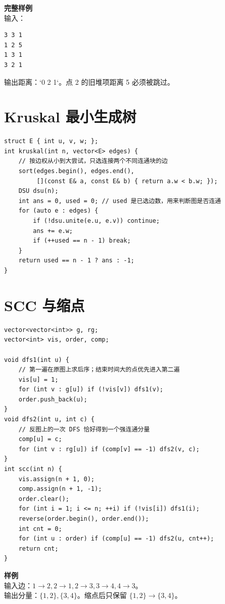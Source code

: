 \begin{card}
\textbf{完整样例}\\
输入：
\begin{lstlisting}
3 3 1
1 2 5
1 3 1
3 2 1
\end{lstlisting}
输出距离：`0 2 1`。点 2 的旧堆项距离 5 必须被跳过。
\end{card}

\section{Kruskal 最小生成树}


\begin{lstlisting}[style=cpp]
struct E { int u, v, w; };
int kruskal(int n, vector<E> edges) {
    // 按边权从小到大尝试，只选连接两个不同连通块的边
    sort(edges.begin(), edges.end(),
         [](const E& a, const E& b) { return a.w < b.w; });
    DSU dsu(n);
    int ans = 0, used = 0; // used 是已选边数，用来判断图是否连通
    for (auto e : edges) {
        if (!dsu.unite(e.u, e.v)) continue;
        ans += e.w;
        if (++used == n - 1) break;
    }
    return used == n - 1 ? ans : -1;
}
\end{lstlisting}

\section{SCC 与缩点}


\begin{lstlisting}[style=cpp]
vector<vector<int>> g, rg;
vector<int> vis, order, comp;

void dfs1(int u) {
    // 第一遍在原图上求后序；结束时间大的点优先进入第二遍
    vis[u] = 1;
    for (int v : g[u]) if (!vis[v]) dfs1(v);
    order.push_back(u);
}
void dfs2(int u, int c) {
    // 反图上的一次 DFS 恰好得到一个强连通分量
    comp[u] = c;
    for (int v : rg[u]) if (comp[v] == -1) dfs2(v, c);
}
int scc(int n) {
    vis.assign(n + 1, 0);
    comp.assign(n + 1, -1);
    order.clear();
    for (int i = 1; i <= n; ++i) if (!vis[i]) dfs1(i);
    reverse(order.begin(), order.end());
    int cnt = 0;
    for (int u : order) if (comp[u] == -1) dfs2(u, cnt++);
    return cnt;
}
\end{lstlisting}

\begin{card}
\textbf{样例}\\
输入边：\(1\to2,2\to1,2\to3,3\to4,4\to3\)。\\
输出分量：\(\{1,2\},\{3,4\}\)。缩点后只保留 \(\{1,2\}\to\{3,4\}\)。
\end{card}

